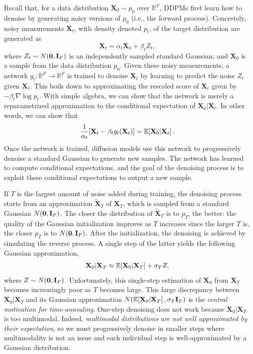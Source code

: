 Recall that, for a data distribution $\mathbf{X}_0 \sim p_0$ over $\mathbb{R}^F$, DDPMs first learn how to denoise by generating noisy versions of $p_0$ (i.e., the forward process). Concretely, noisy measurements $\mathbf{X}_t$, with density denoted $p_t$, of the target distribution are generated as  
\begin{equation}
\mathbf{X}_t = \alpha_t \mathbf{X}_0 +\beta_t Z_t,
\label{eq:noising}
\end{equation}
where $Z_t \sim N\mathopen{}\left(\mathbf{0}, \mathbf{I}_F\right)$ is an independently sampled standard Gaussian; and $\mathbf{X}_0$ is a sample from the data distribution $p_0$. Given these noisy measurements, a network $g_t:\mathbb{R}^F\to\mathbb{R}^F$ is trained to denoise $\mathbf{X}_t$ by learning to predict the noise $Z_t$ given $\mathbf{X}_t$. This boils down to approximating the rescaled score of $\mathbf{X}_t$ given by $-\beta_t \nabla \log p_t$. With simple algebra, we can show that the network is merely a reparametrized approximation to the conditional expectation of $\mathbf{X}_0|\mathbf{X}_t$. In other words, we can show that
\begin{equation}
\label{eq:reparam}
\frac{1}{\alpha_t}\mathopen{}\left[\mathbf{X}_t - \beta_t g_t\mathopen{}\left(\mathbf{X}_t\right)\right] = \mathbb{E}\mathopen{}\left[\mathbf{X}_0|\mathbf{X}_t\right].
\end{equation}
Once the network is trained, diffusion models use this network to progressively denoise a standard Gaussian to generate new samples. The network has learned to compute conditional expectations, and the goal of the denoising process is to exploit these conditional expectations to output a new sample. 

If $T$ is the largest amount of noise added during training, the denoising process starts from an approximation $\tilde{\mathbf{X}}_T$ of $\mathbf{X}_T$, which is sampled from a standard Gaussian $N\mathopen{}\left(\mathbf{0}, \mathbf{I}_F\right)$. The closer the distribution of $\tilde{\mathbf{X}}_T$ is to $p_T$, the better: the quality of the Gaussian initialization improves as $T$ increases since the larger $T$ is, the closer $p_T$ is to $N\mathopen{}\left(\mathbf{0}, \mathbf{I}_F\right)$. After the initialization, the denoising is achieved by simulating the reverse process. A single step of the latter yields the following Gaussian approximation, 
\begin{equation}
\label{eq:revdiff}
    \mathbf{X}_0|\mathbf{X}_T \approx \mathbb{E}\mathopen{}\left[\mathbf{X}_0|\mathbf{X}_T\right] + \sigma_T Z,
\end{equation}
where $Z \sim N\mathopen{}\left(\mathbf{0}, \mathbf{I}_F\right)$. Unfortunately, this single-step estimation of $\mathbf{X}_0$ from $\mathbf{X}_T$ becomes increasingly poor as $T$ becomes large. This large discrepancy between $\mathbf{X}_0|\mathbf{X}_T$ and its Gaussian approximation $N\mathopen{}\left(\mathbb{E}\mathopen{}\left[\mathbf{X}_0|\mathbf{X}_T\right], \sigma_T \mathbf{I}_F\right)$ is the \emph{central motivation for time-annealing}. One-step denoising does not work because $\mathbf{X}_0|\mathbf{X}_T$ is too multimodal. Indeed, \emph{multimodal distributions are not well approximated by their expectation}, so we must progressively denoise in smaller steps where multimodality is not an issue and each individual step is well-approximated by a Gaussian distribution. 

